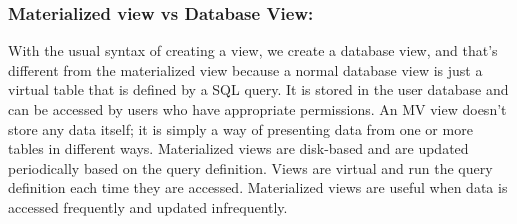 \subsubsection{Materialized view vs Database View:} With the usual syntax of creating a view, we create a database view, and that's different from the materialized view because a normal database view is just a virtual table that is defined by a SQL query. It is stored in the user database and can be accessed by users who have appropriate permissions. An MV view doesn't store any data itself; it is simply a way of presenting data from one or more tables in different ways. Materialized views are disk-based and are updated periodically based on the query definition.\cite{Stackoverflow-author-08-2008} Views are virtual and run the query definition each time they are accessed. Materialized views are useful when data is accessed frequently and updated infrequently.